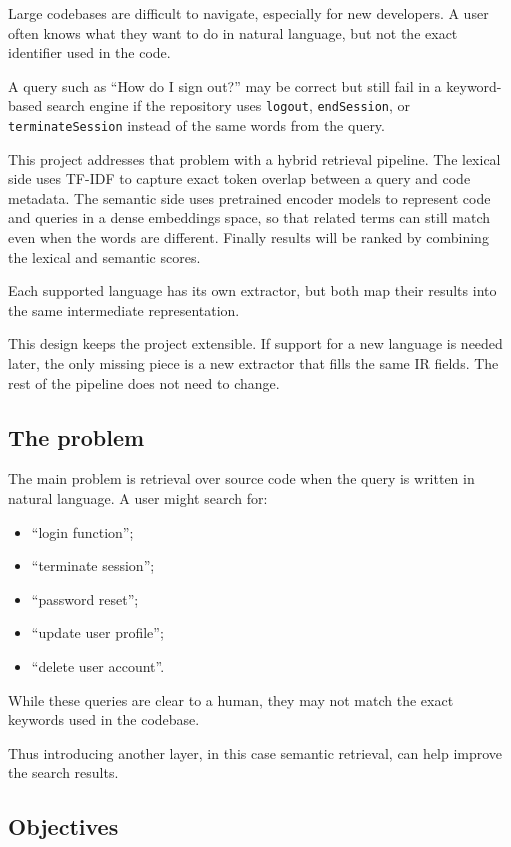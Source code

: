 \documentclass[12pt]{article}
\begin{document}
Large codebases are difficult to navigate, especially for new developers. A user often knows what they want to do in natural language,
but not the exact identifier used in the code.

A query such as ``How do I sign out?'' may be correct but still fail in a keyword-based search engine if the repository uses
\texttt{logout}, \texttt{endSession}, or \texttt{terminateSession} instead of the same words from the query.

This project addresses that problem with a hybrid retrieval pipeline. The lexical side uses TF-IDF to capture exact token overlap between
a query and code metadata. The semantic side uses pretrained encoder models to represent code and queries in a dense embeddings space,
so that related terms can still match even when the words are different.
Finally results will be ranked by combining the lexical and semantic scores.

Each supported language has its own extractor, but both map their results into the same intermediate representation.

This design keeps the project extensible. If support for a new language is needed later, the only missing piece is a new extractor that fills the same IR fields.
The rest of the pipeline does not need to change.

\subsection{The problem}
\label{subsec:problem}

The main problem is retrieval over source code when the query is written in natural language. A user might search for:

\begin{itemize}
  \item ``login function'';
  \item ``terminate session'';
  \item ``password reset'';
  \item ``update user profile'';
  \item ``delete user account''.
\end{itemize}

While these queries are clear to a human, they may not match the exact keywords used in the codebase.

Thus introducing another layer, in this case semantic retrieval, can help improve the search results.

\subsection{Objectives}
\label{subsec:objectives}
\end{document}
